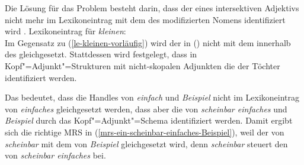 Die Lösung für das Problem besteht darin, dass der \ltopw eines intersektiven Adjektivs nicht mehr
im Lexikoneintrag mit dem des modifizierten Nomens identifiziert wird \citep[Abschnitt~6.3]{CFPS2005a}. 
\eas
\label{le-kleinen-sem}%
Lexikoneintrag für \emph{kleinen}:\\%
\zs
Im Gegensatz zu (\ref{le-kleinen-vorläufig}) wird der \ltopw in () nicht mit dem \ltopw innerhalb des \modwes gleichgesetzt.
Stattdessen wird festgelegt, dass in Kopf"=Adjunkt"=Strukturen mit nicht-skopalen Adjunkten die \ltopwe der Töchter identifiziert
werden. 
\ea
\label{ex-scopal-ltop}
 \impl\\[2mm]
\mbox{}\hfill 
{}
\z

\noindent
Das bedeutet, dass die Handles von \emph{einfach} und \emph{Beispiel} nicht im
Lexikoneintrag von \emph{einfaches} gleichgesetzt werden, dass aber die \ltopwe von \emph{scheinbar
  einfaches} und \emph{Beispiel} durch das Kopf"=Adjunkt"=Schema identifiziert werden. Damit ergibt
sich die richtige MRS in (\ref{mrs-ein-scheinbar-einfaches-Beispiel}), weil der \ltopw von
\emph{scheinbar} mit dem von \emph{Beispiel} gleichgesetzt wird, denn \emph{scheinbar} steuert
den \ltopw von \emph{scheinbar einfaches} bei.

